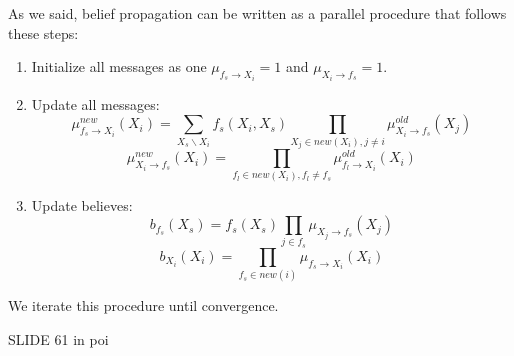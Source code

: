 \documentclass[12pt, a4paper]{report}
\begin{document}
    As we said, belief propagation can be written as a parallel procedure that follows these steps: 
    \begin{enumerate}
        \item Initialize all messages as one $\mu_{f_s\rightarrow X_i}= 1$ and $\mu_{X_i \rightarrow f_s}= 1$. 
        \item Update all messages: 
            \[\mu_{f_s\rightarrow X_i}^{new}(X_i)=\sum_{X_s \backslash X_i}f_s(X_i,X_s)\prod_{X_j \in new(X_i), j \neq i}\mu_{X_i \rightarrow f_s}^{old}(X_j)\]
            \[\mu_{X_i \rightarrow f_s}^{new}(X_i)=\prod_{f_l \in new(X_i),f_l \neq f_s}\mu_{f_l \rightarrow X_i}^{old}(X_i)\]
        \item Update believes: 
            \[b_{f_s}(X_s)=f_s(X_s) \prod_{j \in f_s}\mu_{X_j \rightarrow f_s}(X_j)\]
            \[b_{X_i}(X_i)=\prod_{f_s \in new(i)}\mu_{f_s \rightarrow X_i}(X_i)\]
    \end{enumerate}
    We iterate this procedure until convergence. 
    \begin{example}
        SLIDE 61 in poi
    \end{example}
\end{document}

